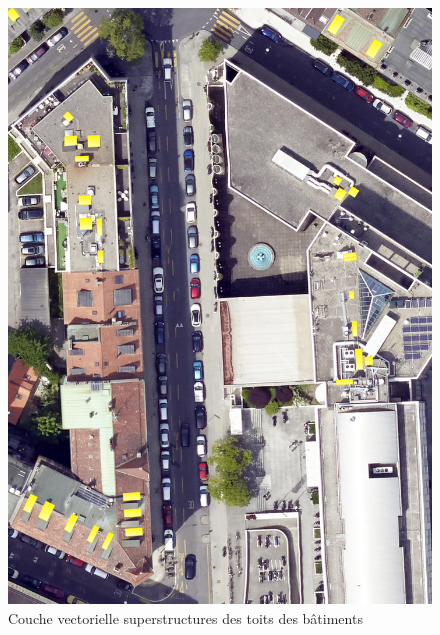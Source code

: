 \begin{figure}[H]
    \centering
    \includegraphics[width=1\linewidth]{02-main//figures/ch3_dataset_methodo_04_batiment_horsol_toiture_sp.png}
    \caption{Couche vectorielle superstructures des toits des bâtiments}
    \label{fig:ch3_dataset_methodo_04_batiment_horsol_toiture_sp}
\end{figure}


















\newpage
